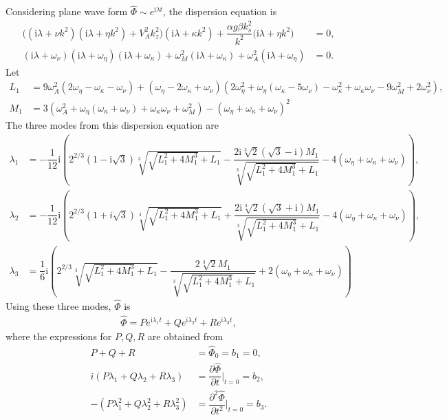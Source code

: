 \documentclass[12pt,psfig]{article}
\begin{document}
Considering plane wave form $\hat{\Phi}\sim e^{\mathrm{i}\lambda t}$, the dispersion equation is
\begin{align*}
\Biggl(\left(\mathrm{i}\lambda+\nu k^2\right)\left(\mathrm{i}\lambda+\eta k^2\right)+V_A^2k_z^2\Biggr)\left(\mathrm{i}\lambda+\kappa k^2\right)+ \dfrac{\alpha g\beta k_s^2}{k^2}\Biggl(\mathrm{i}\lambda+\eta k^2\Biggr)&=0,\\ 
\left(\mathrm{i}\lambda+\omega_\nu\right)\left(\mathrm{i}\lambda+\omega_\eta\right)\left(\mathrm{i}\lambda+\omega_\kappa\right)+\omega_M^2\left(\mathrm{i}\lambda+\omega_\kappa\right)+ \omega_A^2(\mathrm{i}\lambda+\omega_\eta)&=0.
\end{align*}
Let
\begin{align*}
L_1
&=9 \omega_A^2 (2 \omega_\eta-\omega_\kappa-\omega_\nu)+(\omega_\eta-2 \omega_\kappa+\omega_\nu) \left(2 \omega_\eta^2+\omega_\eta (\omega_\kappa-5 \omega_\nu)-\omega_\kappa^2+\omega_\kappa \omega_\nu-9 \omega_M^2+2 \omega_\nu^2\right),\\
M_1&= 3 \left(\omega_A^2+\omega_\eta (\omega_\kappa+\omega_\nu)+\omega_\kappa \omega_\nu+\omega_M^2\right)-(\omega_\eta+\omega_\kappa+\omega_\nu)^2
\end{align*}
The three modes from this dispersion equation are
\begin{align*}
\lambda_1&=-\dfrac{1}{12} \mathrm{i} \left(2^{2/3} \left(1-\mathrm{i} \sqrt{3}\right) \sqrt[3]{\sqrt{L_1^2+4 M_1^3}+L_1}-\dfrac{2 \mathrm{i} \sqrt[3]{2} \left(\sqrt{3}-\mathrm{i}\right) M_1}{\sqrt[3]{\sqrt{L_1^2+4 M_1^3}+L_1}}-4 (\omega_\eta+\omega_\kappa+\omega_\nu)\right),\\
\lambda_2&=-\dfrac{1}{12} \mathrm{i} \left(2^{2/3} \left(1+i \sqrt{3}\right) \sqrt[3]{\sqrt{L_1^2+4 M_1^3}+L_1}+\dfrac{2 \mathrm{i} \sqrt[3]{2} \left(\sqrt{3}+\mathrm{i}\right) M_1}{\sqrt[3]{\sqrt{L_1^2+4 M_1^3}+L_1}}-4 (\omega_\eta+\omega_\kappa+\omega_\nu)\right),\\
\lambda_3&=\dfrac{1}{6} \mathrm{i} \left(2^{2/3} \sqrt[3]{\sqrt{L_1^2+4 M_1^3}+L_1}-\dfrac{2 \sqrt[3]{2} M_1}{\sqrt[3]{\sqrt{L_1^2+4 M_1^3}+L_1}}+2 (\omega_\eta+\omega_\kappa+\omega_\nu)\right)
\end{align*}
Using these three modes, $\hat{\Phi}$ is
\begin{align}
\hat{\Phi}=Pe^{\mathrm{i}\lambda_1t}+Qe^{\mathrm{i}\lambda_2t}+Re^{\mathrm{i}\lambda_3t},\label{flux_soln}
\end{align}
where the expressions for $P,Q,R$ are obtained from
\begin{align*}
P+Q+R&=\hat{\Phi}_0=b_1=0,\\
i(P\lambda_1+Q\lambda_2+R\lambda_3)&=\dfrac{\partial \hat{\Phi}}{\partial t}\bigg|_{t=0}=b_2,\\
-(P\lambda_1^2+Q\lambda_2^2+R\lambda_3^2)&=\dfrac{\partial^2 \hat{\Phi}}{\partial t^2}\bigg|_{t=0}=b_3.
\end{align*}
\end{document}
